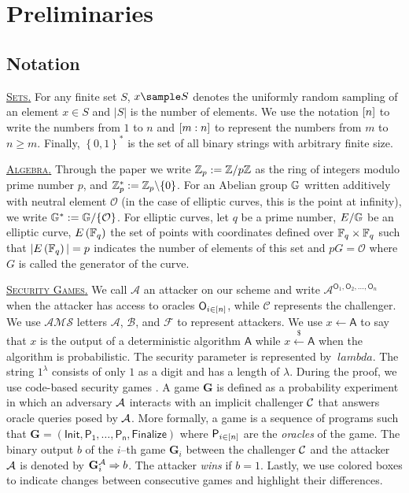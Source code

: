 \documentclass[version=submission, floatrow]{iacrcc}
\begin{document}
\section{Preliminaries}\label{sec:preliminaries}

\subsection{Notation}
\noindent\underline{\textsc{Sets}.} For any finite set $S$, $x \sample S$ denotes the uniformly random sampling of an element $x \in S$ and $|S|$ is the number of elements. 
% 
We use the notation $\left[n\right]$ to write the numbers from $1$ to $n$ and $\left[m:n\right]$ to represent the numbers from $m$ to $n \ge m$. 
% 
Finally, $\left\{0,1\right\}^{\ast}$ is the set of all binary strings with arbitrary finite size.

\noindent\underline{\textsc{Algebra}.} Through the paper we write $\mathbb{Z}_{p} := \mathbb{Z}/p\mathbb{Z}$ as the ring of integers modulo prime number $p$, and $\mathbb{Z}_{p}^{\ast} := \mathbb{Z}_{p}\backslash\{0\}$. For an Abelian group $\mathbb{G}$ written additively with neutral element $\mathcal{O}$ (in the case of elliptic curves, this is the point at infinity), we write $\mathbb{G}^{*} := \mathbb{G} / \{\mathcal{O}\}$. For elliptic curves, let $q$ be a prime number, $E/\mathbb{G}$ be an elliptic curve, $E \left(\mathbb{F}_{q}\right)$ the set of points with coordinates defined over $\mathbb{F}_{q}\times\mathbb{F}_{q}$ such that $|E \left(\mathbb{F}_{q}\right)| = p$ indicates the number of elements of this set and $pG = \mathcal{O}$ where $G$ is called the generator of the curve. 
%

\noindent\underline{\textsc{Security Games}.} We call $\mathcal{A}$ an attacker on our scheme and write $\mathcal{A}^{\mathsf{O}_{1}, \mathsf{O}_{2},\ldots,\mathsf{O}_{n}}$ when the attacker has access to oracles $\mathsf{O}_{i \in \left[n\right]}$, while $\mathcal{C}$ represents the challenger. We use $\mathcal{AMS}$ letters $\mathcal{A}$, $\mathcal{B}$, and $\mathcal{F}$ to represent attackers. We use $x \leftarrow \mathsf{A}$ to say that $x$ is the output of a deterministic algorithm $\mathsf{A}$ while $x \xleftarrow{\$} \mathsf{A}$ when the algorithm is probabilistic. The security parameter is represented by $\ lambda$. The string $1^{\lambda}$ consists of only $1$ as a digit and has a length of $\lambda$. During the proof, we use code-based security games \cite{RogwayEprint2004, Rogway2006}. A game $\mathbf{G}$ is defined as a probability experiment in which an adversary $\mathcal{A}$ interacts with an implicit challenger $\mathcal{C}$ that answers oracle queries posed by $\mathcal{A}$. More formally, a game is a sequence of programs such that $\mathbf{G} = \left(\mathsf{Init}, \mathsf{P_{1}}, \ldots, \mathsf{P_{n}}, \mathsf{Finalize}\right)$ where $\mathsf{P}_{i \in \left[n\right]}$ are the \emph{oracles} of the game. The binary output $b$ of the $i$--th game $\mathbf{G}_{i}$ between the challenger $\mathcal{C}$ and the attacker $\mathcal{A}$ is denoted by $\mathbf{G}_{i}^{\mathcal{A}} \Rightarrow b$. The attacker \emph{wins} if $b = 1$. Lastly, we use colored boxes to indicate changes between consecutive games and highlight their differences.
\end{document}
